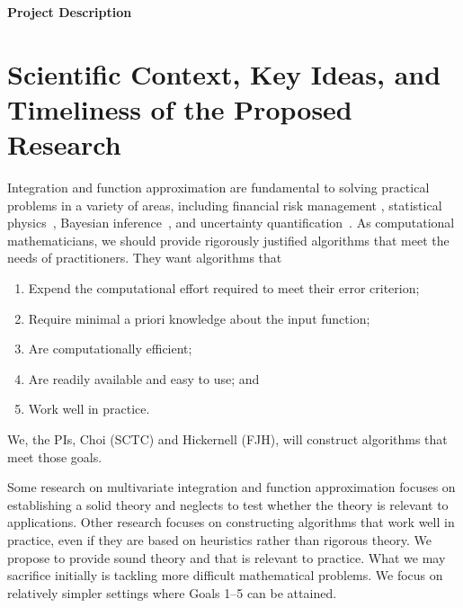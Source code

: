 \documentclass[11pt]{NSFamsart}
\begin{document}

\centerline{\Large \textbf{Project Description}}
\vspace{-2ex}

\setcounter{tocdepth}{1}
\tableofcontents

\vspace{-6ex}

\section{Scientific Context, Key Ideas,  and Timeliness of the Proposed Research}
Integration and function approximation are fundamental to
solving practical problems in a variety of areas, including financial risk management \cite{Gla03}, 
statistical physics~\cite{LanBin14}, 
Bayesian inference~\cite{GelEtal13}, and uncertainty quantification~\cite{ForEtal09, Smi14a}.  As computational mathematicians, we should provide rigorously justified algorithms that meet the needs of practitioners.  They want algorithms that 
\begin{enumerate}[leftmargin = 15ex]
\renewcommand{\labelenumi}{\textbf{Goal \arabic{enumi}.}}
    \item \label{GoalOne} Expend the  
computational effort required to meet their error criterion;
\item \label{GoalTwo} Require minimal a priori knowledge about the input function;

\item \label{GoalThree} Are computationally efficient;

\item \label{GoalFour} Are readily available and easy to use; and

\item \label{GoalFive} Work well in practice.
\end{enumerate}
We, the PIs, Choi (SCTC) and Hickernell (FJH), will construct algorithms that meet those goals.

Some research on multivariate integration and function approximation focuses on establishing a solid theory and neglects to test whether the theory is relevant to applications.  Other research focuses on constructing algorithms that work well in practice, even if they are based on heuristics rather than rigorous theory.  We propose to provide sound theory and that is relevant to practice.  What we may sacrifice initially is tackling more difficult mathematical problems.  We focus on  relatively simpler settings where Goals 1--5 can be attained.
\end{document}

